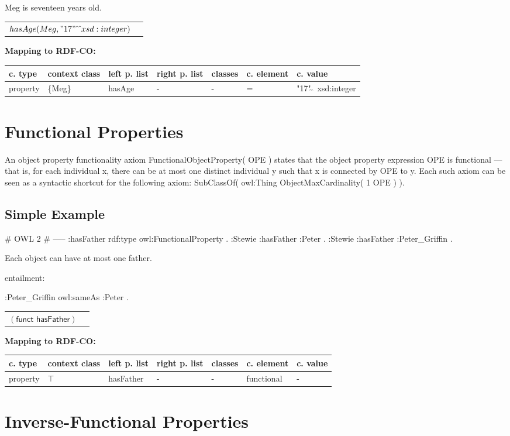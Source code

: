 \documentclass{llncs}
\newenvironment{gcotable}{
  \scriptsize
  \sffamily
  \vspace{0cm}
	\begin{center}
	\textbf{\vspace{0.4cm}Mapping to RDF-CO:} \\
  \begin{tabular}{l|l|l|l|l|l|l}
	\hline
  \textbf{c. type} & \textbf{context class} & \textbf{left p. list} & \textbf{right p. list} & \textbf{classes} & \textbf{c. element} & \textbf{c. value} \\
  \hline

}{
  \hline
  \end{tabular}
	\end{center}
}
\newenvironment{DL}{
  \vspace{0cm}
	\begin{center}
  \begin{tabular}{r l}

}{
  \end{tabular}
	\end{center}
}
\begin{document}
Meg is seventeen years old. 

\begin{DL}
$hasAge ( Meg ,"17"\hat{\ } \hat{\ } xsd:integer ) $\\
\end{DL}

\begin{gcotable}
property & \{Meg\} & hasAge & - & - & = & "17"$\hat{\ } \hat{\ }$ xsd:integer \\
\end{gcotable}

\section{Functional Properties}

An object property functionality axiom FunctionalObjectProperty( OPE ) states that the object property expression OPE is functional — that is, for each individual x, there can be at most one distinct individual y such that x is connected by OPE to y. Each such axiom can be seen as a syntactic shortcut for the following axiom: SubClassOf( owl:Thing ObjectMaxCardinality( 1 OPE ) ).

\subsection{Simple Example}

\begin{ex}
# OWL 2
# -----
:hasFather rdf:type owl:FunctionalProperty . 	
:Stewie :hasFather :Peter . 	
:Stewie :hasFather :Peter_Griffin . 
\end{ex}

Each object can have at most one father. 

entailment:

\begin{ex}
:Peter_Griffin owl:sameAs :Peter .  
\end{ex}

\begin{DL}
$(\textsf{funct } \textsf{hasFather})$
\end{DL}

\begin{gcotable}
property & $\top$ & hasFather & - & - & functional & - \\
\end{gcotable}

\section{Inverse-Functional Properties}
\end{document}
